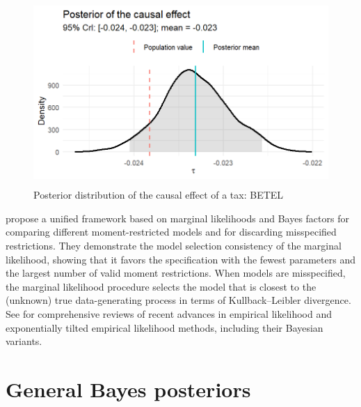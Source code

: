 \begin{figure}[h!]
	\includegraphics[width=340pt, height=200pt]{Chapters/chapter12/figures/fig12_SimCausality.png}
	\caption[List of figure caption goes here]{Posterior distribution of the causal effect of a tax: BETEL}\label{fig12_SimCausality}
\end{figure} 
  
\cite{chib2018moment} propose a unified framework based on marginal likelihoods and Bayes factors for comparing different moment-restricted models and for discarding misspecified restrictions. They demonstrate the model selection consistency of the marginal likelihood, showing that it favors the specification with the fewest parameters and the largest number of valid moment restrictions. When models are misspecified, the marginal likelihood procedure selects the model that is closest to the (unknown) true data-generating process in terms of Kullback–Leibler divergence. See \cite{lazar2021review, liu2023review} for comprehensive reviews of recent advances in empirical likelihood and exponentially tilted empirical likelihood methods, including their Bayesian variants.

\section{General Bayes posteriors}\label{sec12_10}

